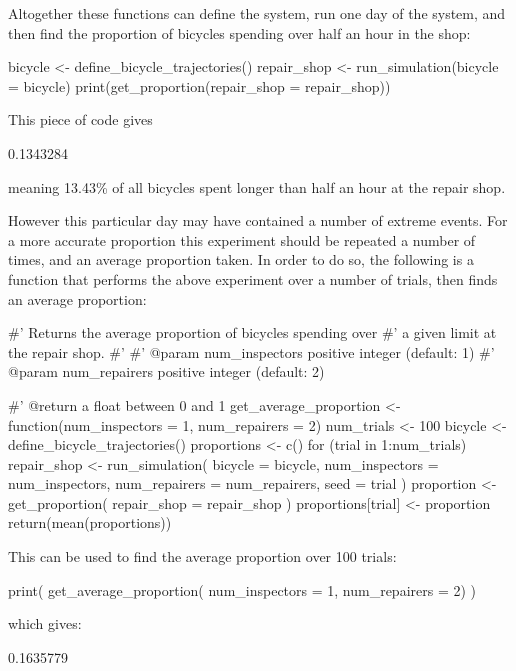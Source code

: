 Altogether these functions can define the system, run one day of the system, and
then find the proportion of bicycles spending over half an hour in the shop:

\begin{Rin}
bicycle <- define_bicycle_trajectories()
repair_shop <- run_simulation(bicycle = bicycle)
print(get_proportion(repair_shop = repair_shop))
\end{Rin}

This piece of code gives

\begin{Rout}
[1] 0.1343284
\end{Rout}

meaning 13.43\% of all bicycles spent longer than half an hour at the repair
shop.

However this particular day may have contained a number of extreme events.  For
a more accurate proportion this experiment should be repeated a number of times,
and an average proportion taken.  In order to do so, the following is a function
that performs the above experiment over a number of trials, then finds an
average proportion:

\begin{Rin}
#' Returns the average proportion of bicycles spending over
#' a given limit at the repair shop.
#'
#' @param num_inspectors positive integer (default: 1)
#' @param num_repairers positive integer (default: 2)

#' @return a float between 0 and 1
get_average_proportion <- function(num_inspectors = 1,
                                   num_repairers = 2) {
  num_trials <- 100
  bicycle <- define_bicycle_trajectories()
  proportions <- c()
  for (trial in 1:num_trials) {
    repair_shop <- run_simulation(
      bicycle = bicycle,
      num_inspectors = num_inspectors,
      num_repairers = num_repairers,
      seed = trial
    )
    proportion <- get_proportion(
      repair_shop = repair_shop
    )
    proportions[trial] <- proportion
  }
  return(mean(proportions))
}
\end{Rin}

This can be used to find the average proportion over 100 trials:

\begin{Rin}
print(
  get_average_proportion(
    num_inspectors = 1,
    num_repairers = 2)
)
\end{Rin}

which gives:

\begin{Rout}
[1] 0.1635779
\end{Rout}

